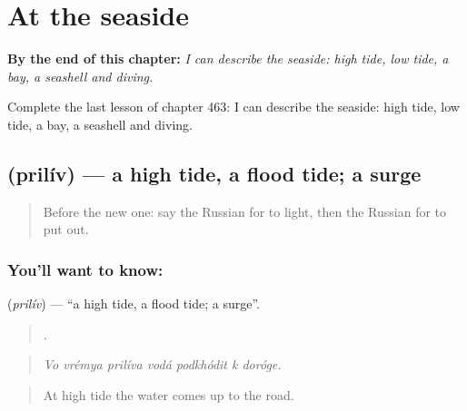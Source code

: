 
\chapter{At the seaside}
\label{ch:ru-at-the-seaside}

\begin{chapteropening}
\textbf{By the end of this chapter:} \emph{I can describe the seaside: high tide, low tide, a bay, a seashell and diving.}

Complete the last lesson of chapter 463: I can describe the seaside: high tide, low tide, a bay, a seashell and diving.
\end{chapteropening}

\section[\texorpdfstring{\ru{прилив} (prilív)}{прилив (prilív)}]{ (prilív) — a high tide, a flood tide; a surge}

\label{lesson:RU-C463-priliv}



\begin{quote}
Before the new one: say the Russian for to light, then the Russian for to put out.
\end{quote}

\subsection*{You'll want to know: }
\textbf{} (\emph{prilív}) — \textquotedblleft{}a high tide, a flood tide; a surge\textquotedblright{}.

\begin{quote}
      .
\end{quote}

\begin{quote}
\emph{Vo vrémya prilíva vodá podkhódit k doróge.}
\end{quote}

\begin{quote}
At high tide the water comes up to the road.
\end{quote}

